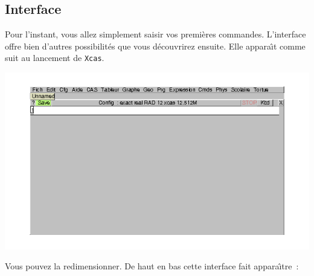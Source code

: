 \documentclass{article}
\begin{document}
\subsection{Interface}
%
Pour l'instant, vous allez simplement saisir vos premi\`eres
commandes. L'interface offre bien d'autres possibilit\'es que vous
d\'ecouvrirez ensuite. Elle appara\^\i t comme suit au lancement de {\tt Xcas}.

\centerline{
\includegraphics[width=\textwidth]{demarr1}
}
Vous pouvez la redimensionner. De haut en bas  cette interface
fait appara\^\i tre~:
\end{document}

